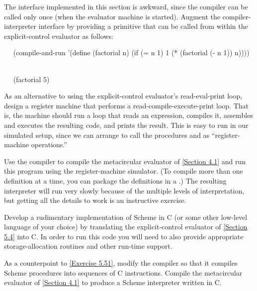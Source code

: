 \begin{exercise}
	\label{Exercise 5.48}
	The  interface implemented in this section is awkward, since the compiler can be called only once (when the evaluator machine is started).
	Augment the compiler-interpreter interface by providing a  primitive that can be called from within the explicit-control evaluator as follows:
	\begin{scheme}
	  ~~
	  (compile-and-run
	   '(define (factorial n)
	      (if (= n 1) 1 (* (factorial (- n 1)) n))))
	  ~~
	  ~~

	  ~~
	  (factorial 5)
	  ~~
	  ~~
	\end{scheme}
\end{exercise}



\begin{exercise}
	\label{Exercise 5.49}
	As an alternative to using the explicit-control evaluator’s read-eval-print loop, design a register machine that performs a read-compile-execute-print loop.
	That is, the machine should run a loop that reads an expression, compiles it, assembles and executes the resulting code, and prints the result.
	This is easy to run in our simulated setup, since we can arrange to call the procedures  and  as “register-machine operations.”
\end{exercise}



\begin{exercise}
	\label{Exercise 5.50}
	Use the compiler to compile the metacircular evaluator of \cref{Section 4.1} and run this program using the register-machine simulator.
	(To compile more than one definition at a time, you can package the definitions in a .)
	The resulting interpreter will run very slowly because of the multiple levels of interpretation, but getting all the details to work is an instructive exercise.
\end{exercise}



\begin{exercise}
	\label{Exercise 5.51}
	Develop a rudimentary implementation of Scheme in C (or some other low-level language of your choice) by translating the explicit-control evaluator of \cref{Section 5.4} into C.
	In order to run this code you will need to also provide appropriate storage-allocation routines and other run-time support.
\end{exercise}



\begin{exercise}
	\label{Exercise 5.52}
	As a counterpoint to \cref{Exercise 5.51}, modify the compiler so that it compiles Scheme procedures into sequences of C instructions.
	Compile the metacircular evaluator of \cref{Section 4.1} to produce a Scheme interpreter written in C.
\end{exercise}
